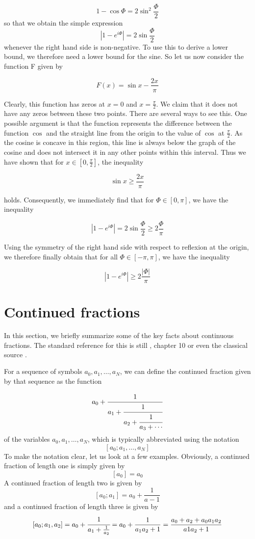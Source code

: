 \documentclass[a4paper, draft]{article}
\theoremstyle{own}
\theoremstyle{remark}
\begin{document}
$$
1 - \cos \Phi = 2 \sin^2 \frac{\Phi}{2}
$$
so that we obtain the simple expression
$$
| 1- e^{i\Phi}| = 2 \sin \frac{\Phi}{2}
$$
whenever the right hand side is non-negative. To use this to derive a lower bound, we therefore need a lower bound for the sine. So let us now consider the function F given by

$$
F(x) = \sin x - \frac{2x}{\pi}
$$

Clearly, this function has zeros at $x = 0$ and $x = \frac{\pi}{2}$. We claim that it does not have any zeros between these two points. There are several ways to see this. One possible argument is that the function represents the difference between the function $\cos $ and the straight line from the origin to the value of $\cos$ at $\frac{\pi}{2}$. As the cosine is concave in this region, this line is always below the graph of the cosine and does not intersect it in any other points within this interval. Thus we have shown that for $x \in [0,\frac{\pi}{2}]$, the inequality

$$
\sin x \geq \frac{2x}{\pi}
$$

holds. Consequently, we immediately find that for $\Phi \in [0,\pi]$, we have the inequality

$$
| 1- e^{i\Phi}| = 2 \sin \frac{\Phi}{2}  \geq 2 \frac{\Phi}{\pi}
$$

Using the symmetry of the right hand side with respect to reflexion at the origin, we therefore finally obtain that for all $\Phi \in [-\pi, \pi]$, we have the inequality

$$
| 1- e^{i\Phi}|   \geq 2 \frac{|\Phi|}{\pi}
$$

\section{Continued fractions}

In this section, we briefly summarize some of the key facts about continuous fractions. The standard reference for this is still \cite{HW}, chapter 10 or even the classical source \cite{Perron}.

For a sequence of symbols $a_0, a_1, \dots, a_N$, we can define the continued fraction given by that sequence as the function

$$
a_0+\cfrac{1}{a_1+\cfrac{1}{a_2+\cfrac{1}{a_3+\cdots}}}
$$
of the variables $a_0, a_1, \dots, a_N$, which is typically abbreviated using the notation
$$
[a_0 ; a_1, \dots, a_N]
$$
To make the notation clear, let us look at a few examples. Obviously, a continued fraction of length one is simply given by
$$
[a_0] = a_0
$$
A continued fraction of length two is given by
$$
[a_0;a_1] = a_0 + \frac{1}{a-1}
$$
and a continued fraction of length three is given by
$$
[a_0;a_1,a_2] = a_0 + \cfrac{1}{a_1 + \frac{1}{a_2}} = a_0 + \frac{1}{a_1a_2 + 1} = \frac{a_0 + a_2 + a_0 a_1 a_2}{a1a_2 + 1}
$$
\end{document}
